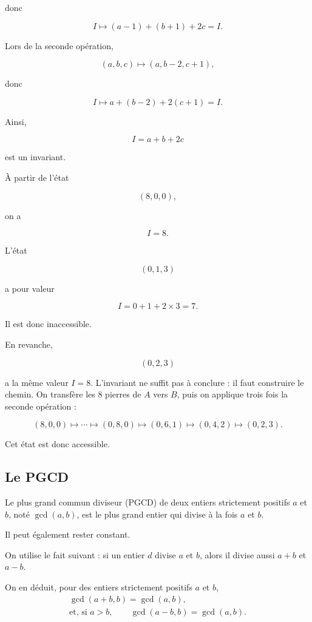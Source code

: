 \documentclass[11pt]{article}
\begin{document}
\begin{exemple}
donc

\[
I\longmapsto(a-1)+(b+1)+2c=I.
\]

Lors de la seconde opération,

\[
(a,b,c)\longmapsto(a,b-2,c+1),
\]

donc

\[
I\longmapsto a+(b-2)+2(c+1)=I.
\]

Ainsi,

\[
\boxed{I=a+b+2c}
\]

est un invariant.

À partir de l'état

\[
(8,0,0),
\]

on a

\[
I=8.
\]

L'état

\[
(0,1,3)
\]

a pour valeur

\[
I=0+1+2\times3=7.
\]

Il est donc inaccessible.

En revanche,

\[
(0,2,3)
\]

a la même valeur \(I=8\). L'invariant ne suffit pas à conclure : il faut
construire le chemin. On transfère les \(8\) pierres de \(A\) vers \(B\),
puis on applique trois fois la seconde opération :

\[
(8,0,0)\longmapsto\cdots\longmapsto(0,8,0)\longmapsto(0,6,1)
\longmapsto(0,4,2)\longmapsto(0,2,3).
\]

Cet état est donc accessible.
\end{exemple}

\subsection{Le PGCD}\label{sec:pgcd}

\begin{definition}[PGCD]
Le plus grand commun diviseur (PGCD) de deux entiers strictement positifs
\(a\) et \(b\), noté \(\gcd(a,b)\), est le plus grand entier qui divise à la
fois \(a\) et \(b\).
\end{definition}

Il peut également rester constant.

On utilise le fait suivant : si un entier \(d\) divise \(a\) et \(b\), alors
il divise aussi \(a+b\) et \(a-b\).

\begin{proposition}
On en déduit, pour des entiers
strictement positifs \(a\) et \(b\),
\[
\boxed{\begin{gathered}
\gcd(a+b,b)=\gcd(a,b),\\
\text{et, si }a>b,\qquad
\gcd(a-b,b)=\gcd(a,b).
\end{gathered}}
\]
\end{proposition}
\end{document}
